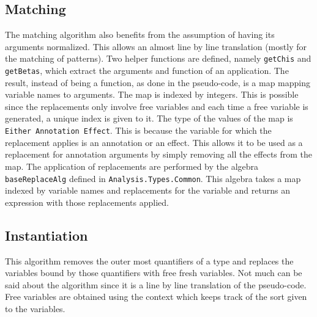 \documentclass[8pt]{extarticle}
\begin{document}
\subsection{Matching}
The matching algorithm also benefits from the assumption of having its arguments normalized. This allows an almost line by line translation (mostly for the matching of patterns). Two helper functions are defined, namely \verb+getChis+ and \verb+getBetas+, which extract the arguments and function of an application. The result, instead of being a function, as done in the pseudo-code, is a map mapping variable names to arguments. The map is indexed by integers. This is possible since the replacements only involve free variables and each time a free variable is generated, a unique index is given to it. The type of the values of the map is \verb+Either Annotation Effect+. This is because the variable for which the replacement applies is an annotation or an effect. This allows it to be used as a replacement for annotation arguments by simply removing all the effects from the map. The application of replacements are performed by the algebra \verb+baseReplaceAlg+ defined in \verb+Analysis.Types.Common+. This algebra takes a map indexed by variable names and replacements for the variable and returns an expression with those replacements applied.
\subsection{Instantiation}
This algorithm removes the outer most quantifiers of a type and replaces the variables bound by those quantifiers with free fresh variables. Not much can be said about the algorithm since it is a line by line translation of the pseudo-code. Free variables are obtained using the context which keeps track of the sort given to the variables.
\end{document}
